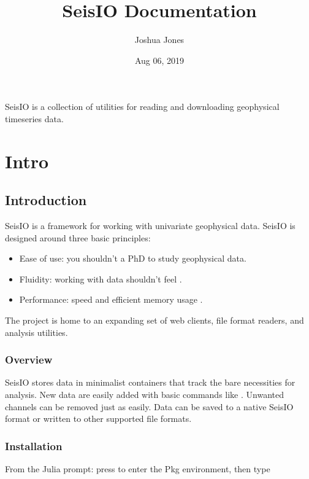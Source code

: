 \documentclass[letterpaper,11pt,english]{sphinxmanual}
\title{SeisIO Documentation}
\date{Aug 06, 2019}
\author{Joshua Jones}
\begin{document}
\pagestyle{empty}
\sphinxmaketitle
\pagestyle{plain}
\sphinxtableofcontents
\pagestyle{normal}
\label{\detokenize{index::doc}}


SeisIO is a collection of utilities for reading and downloading geophysical timeseries data.


\chapter{Intro}
\label{\detokenize{index:intro}}

\section{Introduction}
\label{\detokenize{src/intro:introduction}}\label{\detokenize{src/intro::doc}}
SeisIO is a framework for working with univariate geophysical data.
SeisIO is designed around three basic principles:
\begin{itemize}
\item {} 
Ease of use: you shouldn’t  a PhD to study geophysical data.

\item {} 
Fluidity: working with data shouldn’t feel .

\item {} 
Performance: speed and efficient memory usage .

\end{itemize}

The project is home to an expanding set of web clients, file format readers,
and analysis utilities.


\subsection{Overview}
\label{\detokenize{src/intro:overview}}
SeisIO stores data in minimalist containers that track the bare necessities for
analysis. New data are easily added with basic commands like \sphinxcode{\sphinxupquote{+}}. Unwanted
channels can be removed just as easily. Data can be saved to a native SeisIO
format or written to other supported file formats.


\subsection{Installation}
\label{\detokenize{src/intro:installation}}
From the Julia prompt: press \sphinxcode{\sphinxupquote{{]}}} to enter the Pkg environment, then type
\end{document}
